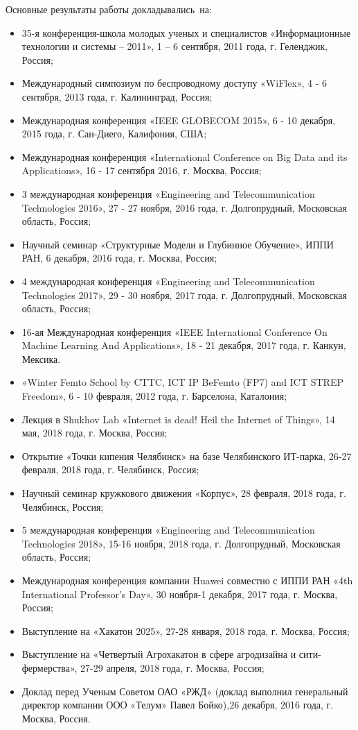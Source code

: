 {\probation}
Основные результаты работы докладывались~на:
\begin{itemize}
\item 35-я конференция-школа молодых ученых и специалистов «Информационные технологии и системы – 2011», 1 – 6 сентября, 2011 года, г. Геленджик, Россия;
\item Международный симпозиум по беспроводному доступу «WiFlex», 4 - 6 сентября,  2013 года, г. Калининград, Россия;
\item Международная конференция «IEEE GLOBECOM 2015», 6 - 10 декабря, 2015 года, г. Сан-Диего, Калифония, США;
\item Международная конференция «International Conference on Big Data and its Applications», 16 - 17 сентября 2016, г. Москва, Россия;
\item 3 международная конференция «Engineering and Telecommunication Technologies 2016», 27 - 27 ноября, 2016 года, г. Долгопрудный, Московская область, Россия;
\item Научный семинар «Структурные Модели и Глубинное Обучение», ИППИ РАН, 6 декабря, 2016 года, г. Москва, Россия;
\item 4 международная конференция «Engineering and Telecommunication Technologies 2017», 29 - 30 ноября, 2017 года, г. Долгопрудный, Московская область, Россия;
\item 16-ая Международная конференция «IEEE International Conference On Machine Learning And Applications», 18 - 21 декабря, 2017 года, г. Канкун, Мексика.
\item «Winter Femto School by CTTC, ICT IP BeFemto (FP7) and ICT STREP Freedom», 6 - 10 февраля, 2012 года, г. Барселона, Каталония;
\item Лекция в Shukhov Lab «Internet is dead! Heil the Internet of Things», 14 мая, 2018 года, г. Москва, Россия;
\item Открытие «Точки кипения Челябинск» на базе Челябинского ИТ-парка, 26-27 февраля, 2018 года, г. Челябинск, Россия;
\item Научный семинар кружкового движения «Корпус», 28 февраля, 2018 года, г. Челябинск, Россия;
\item 5 международная конференция «Engineering and Telecommunication Technologies 2018», 15-16 ноября, 2018 года, г. Долгопрудный, Московская область, Россия;
\item Международная конференция компании Huawei совместно с ИППИ РАН «4th International Professor’s Day», 30 ноября-1 декабря, 2017 года, г. Москва, Россия;
\item Выступление на «Хакатон 2025», 27-28 января, 2018 года, г. Москва, Россия;
\item Выступление на «Четвертый Агрохакатон в сфере агродизайна и сити-фермерства», 27-29 апреля, 2018 года, г. Москва, Россия;
\item Доклад перед Ученым Советом ОАО «РЖД» (доклад выполнил генеральный директор компании ООО «Телум» Павел Бойко),26 декабря, 2016 года, г. Москва, Россия.

\end{itemize}

